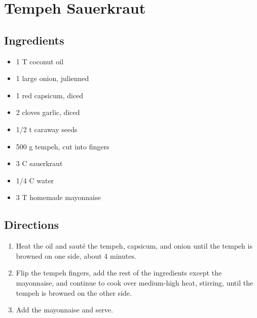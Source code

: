\documentclass[letterpaper,10pt,english]{sphinxmanual}
\begin{document}
\chapter{Tempeh Sauerkraut}
\label{tempeh_sauerkraut:introduction}\label{tempeh_sauerkraut:tempeh-sauerkraut}\label{tempeh_sauerkraut::doc}

\section{Ingredients}
\label{tempeh_sauerkraut:ingredients}\begin{itemize}
\item {} 
1   T   coconut oil

\item {} 
1       large onion, julienned

\item {} 
1       red capsicum, diced

\item {} 
2       cloves garlic, diced

\item {} 
1/2 t   caraway seeds

\item {} 
500 g   tempeh, cut into fingers

\item {} 
3   C   sauerkraut

\item {} 
1/4 C   water

\item {} 
3   T   homemade mayonnaise

\end{itemize}


\section{Directions}
\label{tempeh_sauerkraut:directions}\begin{enumerate}
\item {} 
Heat the oil and sauté the tempeh, capsicum, and onion until the tempeh is browned on one side, about 4 minutes.

\item {} 
Flip the tempeh fingers, add the rest of the ingredients except the mayonnaise, and continue to cook over medium-high heat, stirring, until the tempeh is browned on the other side.

\item {} 
Add the mayonnaise and serve.

\end{enumerate}
\end{document}
